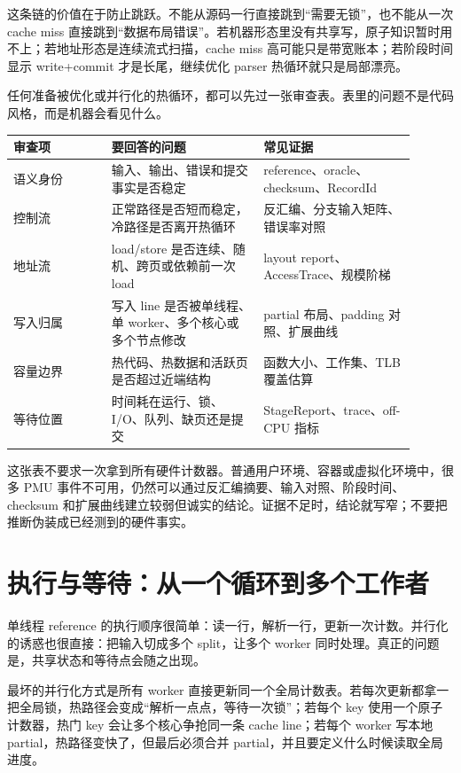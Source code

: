 这条链的价值在于防止跳跃。不能从源码一行直接跳到“需要无锁”，也不能从一次 cache miss 直接跳到“数据布局错误”。若机器形态里没有共享写，原子知识暂时用不上；若地址形态是连续流式扫描，cache miss 高可能只是带宽账本；若阶段时间显示 write+commit 才是长尾，继续优化 parser 热循环就只是局部漂亮。

任何准备被优化或并行化的热循环，都可以先过一张审查表。表里的问题不是代码风格，而是机器会看见什么。

\begin{center}
\small
\begin{tabular}{@{}p{0.22\linewidth}p{0.34\linewidth}p{0.34\linewidth}@{}}
\toprule
审查项 & 要回答的问题 & 常见证据 \\
\midrule
语义身份 & 输入、输出、错误和提交事实是否稳定 & reference、oracle、checksum、RecordId \\
控制流 & 正常路径是否短而稳定，冷路径是否离开热循环 & 反汇编、分支输入矩阵、错误率对照 \\
地址流 & load/store 是否连续、随机、跨页或依赖前一次 load & layout report、AccessTrace、规模阶梯 \\
写入归属 & 写入 line 是否被单线程、单 worker、多个核心或多个节点修改 & partial 布局、padding 对照、扩展曲线 \\
容量边界 & 热代码、热数据和活跃页是否超过近端结构 & 函数大小、工作集、TLB 覆盖估算 \\
等待位置 & 时间耗在运行、锁、I/O、队列、缺页还是提交 & StageReport、trace、off-CPU 指标 \\
\bottomrule
\end{tabular}
\end{center}

这张表不要求一次拿到所有硬件计数器。普通用户环境、容器或虚拟化环境中，很多 PMU 事件不可用，仍然可以通过反汇编摘要、输入对照、阶段时间、checksum 和扩展曲线建立较弱但诚实的结论。证据不足时，结论就写窄；不要把推断伪装成已经测到的硬件事实。

\section{执行与等待：从一个循环到多个工作者}

单线程 reference 的执行顺序很简单：读一行，解析一行，更新一次计数。并行化的诱惑也很直接：把输入切成多个 split，让多个 worker 同时处理。真正的问题是，共享状态和等待点会随之出现。

最坏的并行化方式是所有 worker 直接更新同一个全局计数表。若每次更新都拿一把全局锁，热路径会变成“解析一点点，等待一次锁”；若每个 key 使用一个原子计数器，热门 key 会让多个核心争抢同一条 cache line；若每个 worker 写本地 partial，热路径变快了，但最后必须合并 partial，并且要定义什么时候读取全局进度。

